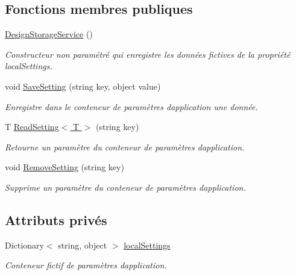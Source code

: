 \subsection*{Fonctions membres publiques}
\begin{DoxyCompactItemize}
\item 
\hyperlink{class_boxes_1_1_services_1_1_storage_1_1_design_storage_service_a6dc72623a7623a0844a127673b89528b}{Design\+Storage\+Service} ()
\begin{DoxyCompactList}\small\item\em Constructeur non paramétré qui enregistre les données fictives de la propriété {\ttfamily local\+Settings}. \end{DoxyCompactList}\item 
void \hyperlink{class_boxes_1_1_services_1_1_storage_1_1_design_storage_service_aca6e4df08c21ca62695f9325162c4491}{Save\+Setting} (string key, object value)
\begin{DoxyCompactList}\small\item\em Enregistre dans le conteneur de paramètres d\textquotesingle{}application une donnée.  \end{DoxyCompactList}\item 
T \hyperlink{class_boxes_1_1_services_1_1_storage_1_1_design_storage_service_ad239cf0434c97667ce1d1c6ec0fba063}{Read\+Setting$<$ T $>$} (string key)
\begin{DoxyCompactList}\small\item\em Retourne un paramètre du conteneur de paramètres d\textquotesingle{}application.  \end{DoxyCompactList}\item 
void \hyperlink{class_boxes_1_1_services_1_1_storage_1_1_design_storage_service_ad570a657f66837a7b769399d1e410a32}{Remove\+Setting} (string key)
\begin{DoxyCompactList}\small\item\em Supprime un paramètre du conteneur de paramètres d\textquotesingle{}application.  \end{DoxyCompactList}\end{DoxyCompactItemize}
\subsection*{Attributs privés}
\begin{DoxyCompactItemize}
\item 
Dictionary$<$ string, object $>$ \hyperlink{class_boxes_1_1_services_1_1_storage_1_1_design_storage_service_a23bedd75a1b91c59dc260879fc377b44}{local\+Settings}
\begin{DoxyCompactList}\small\item\em Conteneur fictif de paramètres d\textquotesingle{}application. \end{DoxyCompactList}\end{DoxyCompactItemize}


